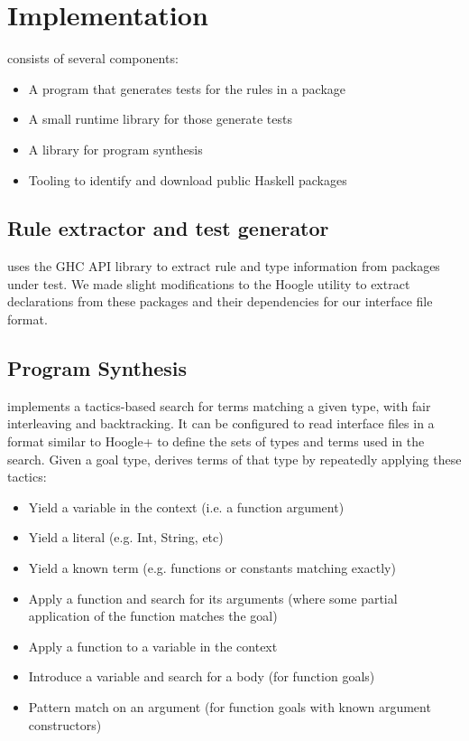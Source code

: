 \section{Implementation}
\label{sec:implementation}

\Rulecheck consists of several components:

\begin{itemize}
  \item A program that generates tests for the rules in a package
  \item A small runtime library for those generate tests
  \item A library for program synthesis
  \item Tooling to identify and download public Haskell packages
\end{itemize}

\subsection{Rule extractor and test generator}\label{sec:implementation:testgen}

\Rulecheck uses the GHC API library to extract rule and type information from packages under test. We made slight modifications to the Hoogle utility to extract declarations from these packages and their dependencies for our interface file format.

\subsection{Program Synthesis}\label{sec:implementation:synthesis}

\Rulecheck implements a tactics-based search for terms matching a given type, with fair interleaving and backtracking. \cite{delahaye2000tactic, kiselyov2005backtracking} It can be configured to read interface files in a format similar to Hoogle+ \cite{james2020digging} to define the sets of types and terms used in the search. Given a goal type, \Rulecheck derives terms of that type by repeatedly applying these tactics:

\begin{itemize}
  \item Yield a variable in the context (i.e. a function argument)
  \item Yield a literal (e.g. Int, String, etc)
  \item Yield a known term (e.g. functions or constants matching exactly)
  \item Apply a function and search for its arguments (where some partial application of the function matches the goal)
  \item Apply a function to a variable in the context
  \item Introduce a variable and search for a body (for function goals)
  \item Pattern match on an argument (for function goals with known argument constructors)
\end{itemize}

